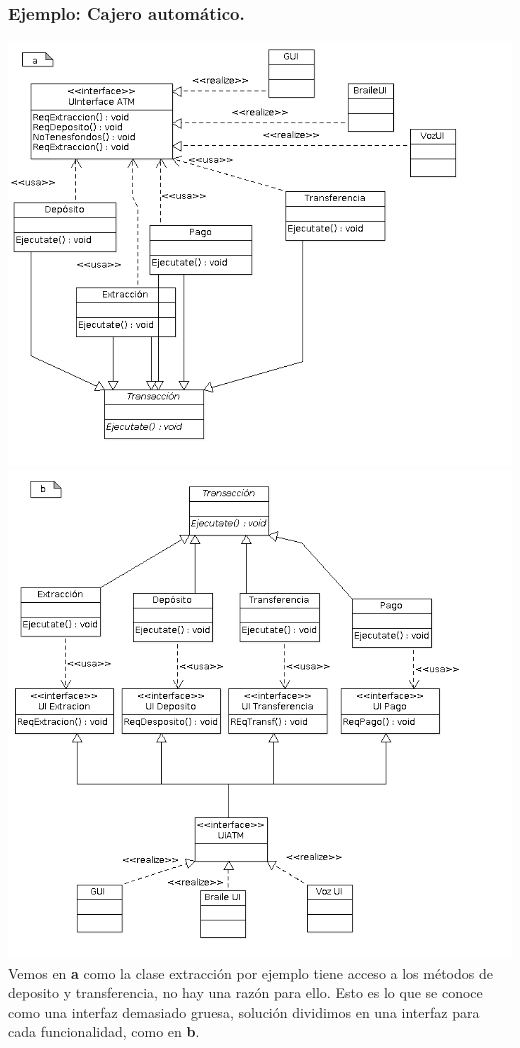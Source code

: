 \documentclass[10pt,a4paper]{article}
\begin{document}
\subsubsection{Ejemplo: Cajero automático.}
\includegraphics[scale=0.5]{./img/ATM-a.png} 
\includegraphics[scale=0.5]{./img/ATM-b.png} 
Vemos en \textbf{a} como la clase extracción por ejemplo tiene acceso a los métodos de deposito y transferencia, no hay una razón para ello. Esto es lo que se conoce como una interfaz demasiado gruesa, solución dividimos en una interfaz para cada funcionalidad, como en \textbf{b}.
\end{document}
